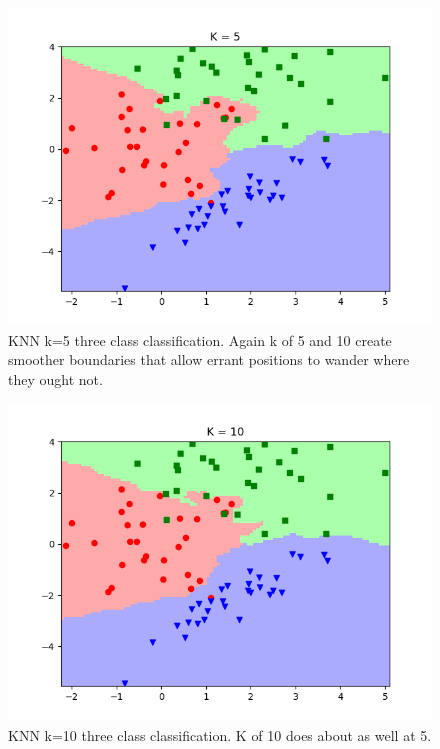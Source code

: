 \documentclass[10pt]{article}
\begin{document}
\begin{itemize}
\begin{figure}[H]
\centering
  \includegraphics{code/knn_three_class_data-k-5.png}
 \caption{KNN k=5 three class classification. Again k of 5 and 10 create smoother boundaries that allow errant positions to wander where they ought not.}
\end{figure}

\begin{figure}[H]
\centering
  \includegraphics{code/knn_three_class_data-k-10.png}
 \caption{KNN k=10 three class classification. K of 10 does about as well at 5.}
\end{figure}


\end{itemize}
\end{document}
